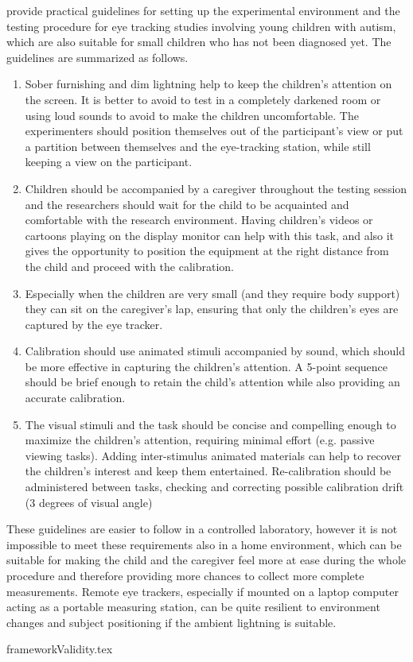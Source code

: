 \cite{sasson2012children} provide practical guidelines for setting up the experimental environment and the testing procedure for eye tracking studies involving young children with autism, which are also suitable for small children who has not been diagnosed yet. The guidelines are summarized as follows.
\begin{enumerate}
    \item Sober furnishing and dim lightning help to keep the children’s attention on the screen. It is better to avoid to test in a completely darkened room or using loud sounds to avoid to make the children uncomfortable. The experimenters should position themselves out of the participant’s view or put a partition between themselves and the eye-tracking station, while still keeping a view on the participant.
    \item Children should be accompanied by a caregiver throughout the testing session and the researchers should wait for the child to be acquainted and comfortable with the research environment. Having children's videos or cartoons playing on the display monitor can help with this task, and also it gives the opportunity to position the equipment at the right distance from the child and proceed with the calibration.
    \item Especially when the children are very small (and they require body support) they can sit on the caregiver’s lap, ensuring that only the children’s eyes are captured by the eye tracker.
    \item Calibration should use animated stimuli accompanied by sound, which should be more effective in capturing the children’s attention. A 5-point sequence should be brief enough to retain the child's attention while also providing an accurate calibration.
    \item The visual stimuli and the task should be concise and compelling enough to maximize the children’s attention, requiring minimal effort (e.g. passive viewing tasks). Adding inter-stimulus animated materials can help to recover the children’s interest and keep them entertained. Re-calibration should be administered between tasks, checking and correcting possible calibration drift (3 degrees of visual angle) 
\end{enumerate}

These guidelines are easier to follow in a controlled laboratory, however it is not impossible to meet these requirements also in a home environment, which can be suitable for making the child and the caregiver feel more at ease during the whole procedure and therefore providing more chances to collect more complete measurements. Remote eye trackers, especially if mounted on a laptop computer acting as a portable measuring station, can be quite resilient to environment changes and subject positioning if the ambient lightning is suitable.



{frameworkValidity.tex}

